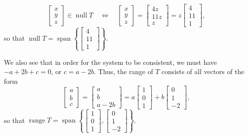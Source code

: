 \documentclass[12pt]{article}
\DeclareMathOperator{\spn}{span}
\DeclareMathOperator{\nul}{null}
\DeclareMathOperator{\range}{range}
\begin{document}
\begin{enumerate}
\[
 \begin{bmatrix}x\\y\\z\end{bmatrix}\in\nul T \quad \Leftrightarrow  \quad \begin{bmatrix}x\\y\\z\end{bmatrix} = \begin{bmatrix}4z\\11z\\z\end{bmatrix} = z\begin{bmatrix}4\\11\\1\end{bmatrix},
\]
so that $\nul T = \spn\left\{\begin{bmatrix}4\\11\\1\end{bmatrix}\right\}$.

We also see that in order for the system to be consistent, we must have $-a+2b+c=0$, or $c=a-2b$. Thus, the range of $T$ consists of all vectors of the form
\[
 \begin{bmatrix}a\\b\\c\end{bmatrix} = \begin{bmatrix}a\\b\\a-2b\end{bmatrix} = a\begin{bmatrix}1\\0\\1\end{bmatrix}+b\begin{bmatrix}0\\1\\-2\end{bmatrix},
\]
so that $\range T = \spn\left\{\begin{bmatrix}1\\0\\1\end{bmatrix},\begin{bmatrix}0\\1\\-2\end{bmatrix}\right\}$.

\end{enumerate}
\end{document}
